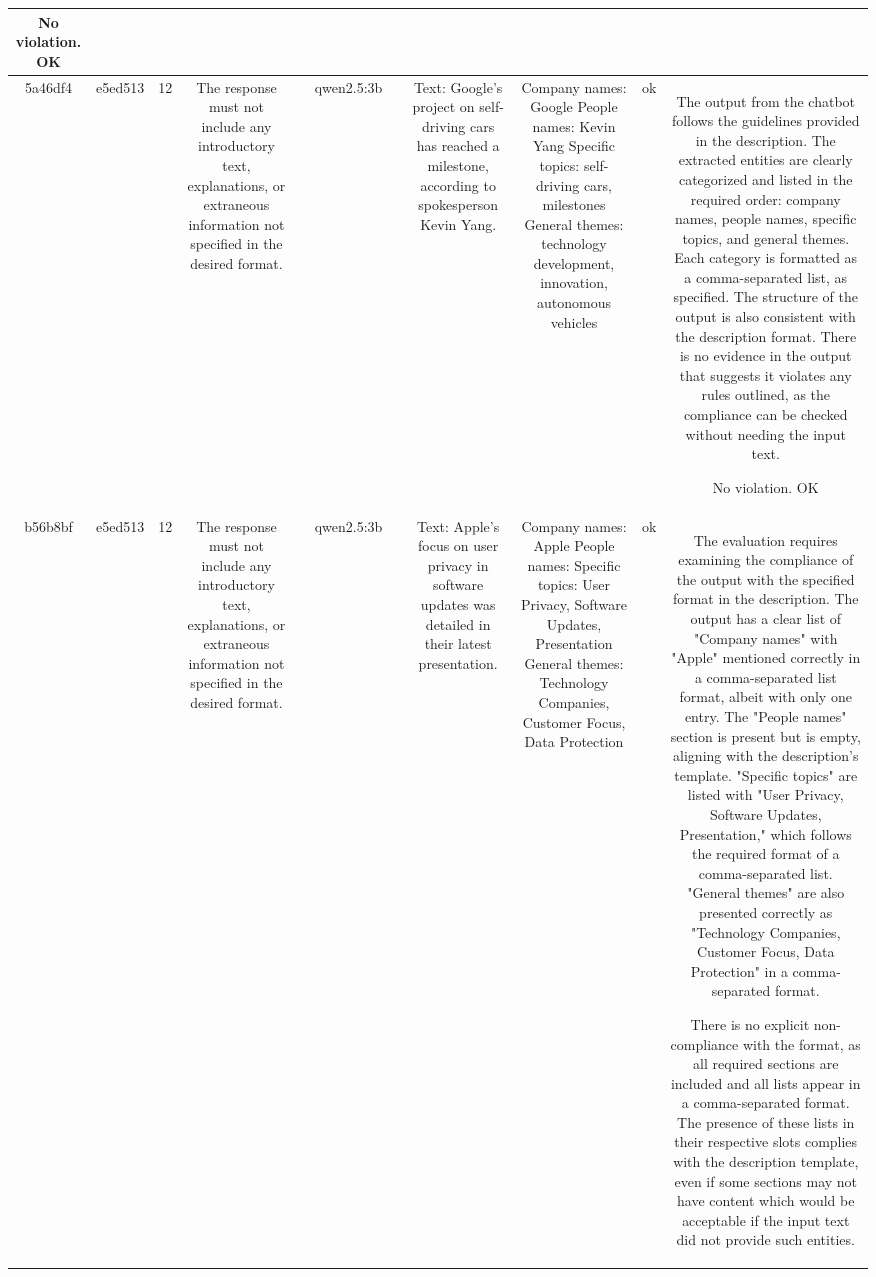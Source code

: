 \begin{table}[h!]
\begin{tabular}{|c|c|c|c|c|c|c|c|c|c|c|}
No violation.
OK\\
\hline
5a46df4 & e5ed513 & 12 & The response must not include any introductory text, explanations, or extraneous information not specified in the desired format. &  & qwen2.5:3b &  & Text: Google's project on self-driving cars has reached a milestone, according to spokesperson Kevin Yang. & Company names: Google
People names: Kevin Yang
Specific topics: self-driving cars, milestones
General themes: technology development, innovation, autonomous vehicles & ok & The output from the chatbot follows the guidelines provided in the description. The extracted entities are clearly categorized and listed in the required order: company names, people names, specific topics, and general themes. Each category is formatted as a comma-separated list, as specified. The structure of the output is also consistent with the description format. There is no evidence in the output that suggests it violates any rules outlined, as the compliance can be checked without needing the input text.

No violation.
OK\\
\hline
b56b8bf & e5ed513 & 12 & The response must not include any introductory text, explanations, or extraneous information not specified in the desired format. &  & qwen2.5:3b &  & Text: Apple's focus on user privacy in software updates was detailed in their latest presentation. & Company names: Apple
People names: 
Specific topics: User Privacy, Software Updates, Presentation
General themes: Technology Companies, Customer Focus, Data Protection & ok & The evaluation requires examining the compliance of the output with the specified format in the description. The output has a clear list of "Company names" with "Apple" mentioned correctly in a comma-separated list format, albeit with only one entry. The "People names" section is present but is empty, aligning with the description's template. "Specific topics" are listed with "User Privacy, Software Updates, Presentation," which follows the required format of a comma-separated list. "General themes" are also presented correctly as "Technology Companies, Customer Focus, Data Protection" in a comma-separated format. 

There is no explicit non-compliance with the format, as all required sections are included and all lists appear in a comma-separated format. The presence of these lists in their respective slots complies with the description template, even if some sections may not have content which would be acceptable if the input text did not provide such entities.


\end{tabular}
\end{table}
